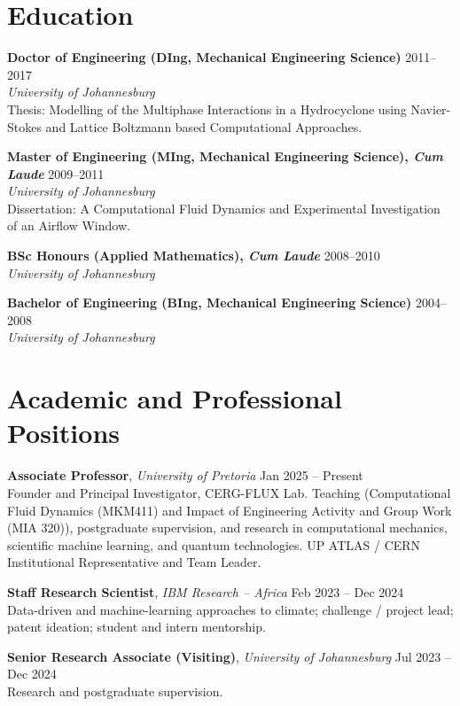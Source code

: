 \documentclass[11pt, a4paper]{article}
\begin{document}
\section{Education}
\textbf{Doctor of Engineering (DIng, Mechanical Engineering Science)} \hfill 2011--2017\\
\textit{University of Johannesburg}\\
Thesis: Modelling of the Multiphase Interactions in a Hydrocyclone using Navier-Stokes and Lattice Boltzmann based Computational Approaches.

\smallskip
\textbf{Master of Engineering (MIng, Mechanical Engineering Science), \textit{Cum Laude}} \hfill 2009--2011\\
\textit{University of Johannesburg}\\
Dissertation: A Computational Fluid Dynamics and Experimental Investigation of an Airflow Window.

\smallskip
\textbf{BSc Honours (Applied Mathematics), \textit{Cum Laude}} \hfill 2008--2010\\
\textit{University of Johannesburg}

\smallskip
\textbf{Bachelor of Engineering (BIng, Mechanical Engineering Science)} \hfill 2004--2008\\
\textit{University of Johannesburg}

\section{Academic and Professional Positions}
\textbf{Associate Professor}, \textit{University of Pretoria} \hfill Jan 2025 -- Present\\
Founder and Principal Investigator, CERG-FLUX Lab. Teaching (Computational Fluid Dynamics (MKM411) and Impact of Engineering Activity and Group Work (MIA 320)), postgraduate supervision, and research in computational mechanics, scientific machine learning, and quantum technologies. UP ATLAS / CERN Institutional Representative and Team Leader.

\smallskip
\textbf{Staff Research Scientist}, \textit{IBM Research -- Africa} \hfill Feb 2023 -- Dec 2024\\
Data-driven and machine-learning approaches to climate; challenge / project lead; patent ideation; student and intern mentorship.

\smallskip
\textbf{Senior Research Associate (Visiting)}, \textit{University of Johannesburg} \hfill Jul 2023 -- Dec 2024\\
Research and postgraduate supervision.
\end{document}
